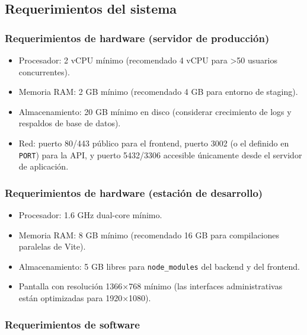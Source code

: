 \documentclass[12pt,letterpaper]{article}
\begin{document}
\subsection{Requerimientos del sistema}

\subsubsection{Requerimientos de hardware (servidor de producción)}

\begin{itemize}
    \item Procesador: 2 vCPU mínimo (recomendado 4 vCPU para >50 usuarios concurrentes).
    \item Memoria RAM: 2 GB mínimo (recomendado 4 GB para entorno de staging).
    \item Almacenamiento: 20 GB mínimo en disco (considerar crecimiento de logs y respaldos de base de datos).
    \item Red: puerto 80/443 público para el frontend, puerto 3002 (o el definido en \texttt{PORT}) para la API, y puerto 5432/3306 accesible únicamente desde el servidor de aplicación.
\end{itemize}

\subsubsection{Requerimientos de hardware (estación de desarrollo)}

\begin{itemize}
    \item Procesador: 1.6 GHz dual-core mínimo.
    \item Memoria RAM: 8 GB mínimo (recomendado 16 GB para compilaciones paralelas de Vite).
    \item Almacenamiento: 5 GB libres para \texttt{node\_modules} del backend y del frontend.
    \item Pantalla con resolución 1366×768 mínimo (las interfaces administrativas están optimizadas para 1920×1080).
\end{itemize}

\subsubsection{Requerimientos de software}
\end{document}
